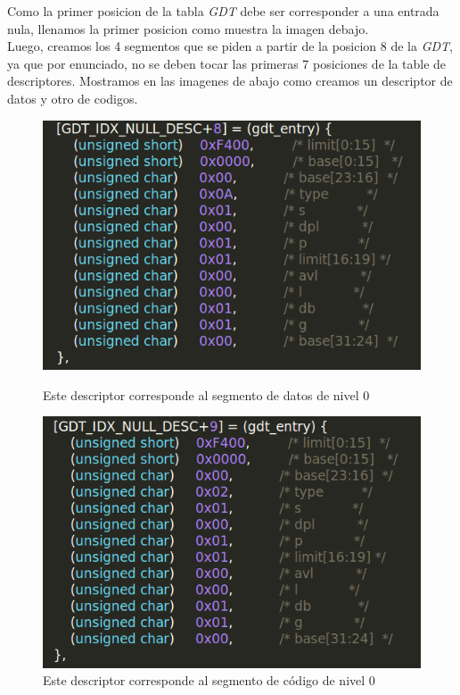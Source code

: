 Como la primer posicion de la tabla \textit{GDT} debe ser corresponder a una entrada nula, llenamos la primer posicion como muestra la imagen debajo.
\\


Luego, creamos los 4 segmentos que se piden a partir de la posicion 8 de la \textit{GDT}, ya que por enunciado, no se deben tocar las primeras 7 posiciones de la table de descriptores. Mostramos en las imagenes de abajo como creamos un descriptor de datos y otro de codigos. 
\\

\begin{figure}[H]
\begin{center}
  \includegraphics[width=\linewidth]{ejercicio1/GDTcodigo0.png}
  \caption{{\small Este descriptor corresponde al segmento de datos de nivel 0}} 
\endminipage
{}
  \includegraphics[width=\linewidth]{ejercicio1/GDTdatos0.png}
  \caption{{\small Este descriptor corresponde al segmento de código de nivel 0}} 
\endminipage
\end{center}
\end{figure}

